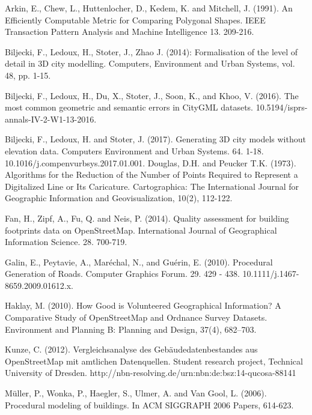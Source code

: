 \documentclass{kththesis}
\begin{document}
\begin{thebibliography}{9}

Arkin, E., Chew, L., Huttenlocher, D., Kedem, K. and Mitchell, J. (1991). An Efficiently Computable Metric for Comparing Polygonal Shapes. IEEE Transaction Pattern Analysis and Machine Intelligence 13. 209-216.

Biljecki, F., Ledoux, H., Stoter, J., Zhao J. (2014): Formalisation of the level of detail in 3D city modelling. Computers, Environment and Urban Systems, vol. 48, pp. 1-15.

Biljecki, F., Ledoux, H., Du, X., Stoter, J., Soon, K., and Khoo, V. (2016). The most common geometric and semantic errors in CityGML datasets. 10.5194/isprs-annals-IV-2-W1-13-2016. 

Biljecki, F., Ledoux, H. and Stoter, J. (2017). Generating 3D city models without elevation data. Computers Environment and Urban Systems. 64. 1-18. 10.1016/j.compenvurbsys.2017.01.001. 
Douglas, D.H. and Peucker T.K. (1973). Algorithms for the Reduction of the Number of Points Required to Represent a Digitalized Line or Its Caricature. Cartographica: The International Journal for Geographic Information and Geovisualization, 10(2), 112-122.

Fan, H., Zipf, A., Fu, Q. and Neis, P. (2014). Quality assessment for building footprints data on OpenStreetMap. International Journal of Geographical Information Science. 28. 700-719.

Galin, E., Peytavie, A., Maréchal, N., and Guérin, E. (2010). Procedural Generation of Roads. Computer Graphics Forum. 29. 429 - 438. 10.1111/j.1467-8659.2009.01612.x. 

Haklay, M. (2010). How Good is Volunteered Geographical Information? A Comparative Study of OpenStreetMap and Ordnance Survey Datasets. Environment and Planning B: Planning and Design, 37(4), 682–703.

Kunze, C. (2012). Vergleichsanalyse des Gebäudedatenbestandes aus OpenStreetMap mit amtlichen Datenquellen. Student research project, Technical University of Dresden. http://nbn-resolving.de/urn:nbn:de:bsz:14-qucosa-88141

Müller, P., Wonka, P., Haegler, S., Ulmer, A. and Van Gool, L. (2006). Procedural modeling of buildings. In ACM SIGGRAPH 2006 Papers, 614-623.


\end{thebibliography}
\end{document}
